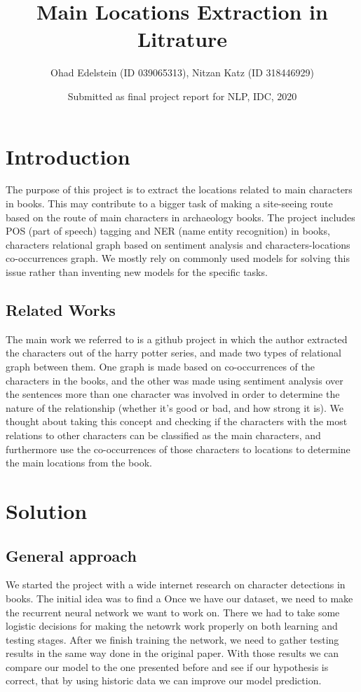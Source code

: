 \documentclass{article}
\title{Main Locations Extraction in Litrature}
\author{Ohad Edelstein (ID 039065313), Nitzan Katz (ID 318446929)}
\date{Submitted as final project report for NLP, IDC, 2020}
\begin{document}
\maketitle

\section{Introduction}

The purpose of this project is to extract the locations related to main characters in books. This may contribute to a bigger task of making a site-seeing route based on the route of main characters in archaeology books. The project includes POS (part of speech) tagging and NER (name entity recognition) in books, characters relational graph based on sentiment analysis and characters-locations co-occurrences graph. We mostly rely on commonly used models for solving this issue rather than inventing new models for the specific tasks.

\subsection{Related Works}
The main work we referred to is a github project\cite{hzjken2019char} in which the author extracted the characters out of the harry potter series, and made two types of relational graph between them. One graph is made based on co-occurrences of the characters in the books, and the other was made using sentiment analysis over the sentences more than one character was involved in order to determine the nature of the relationship (whether it's good or bad, and how strong it is). We thought about taking this concept and checking if the characters with the most relations to other characters can be classified as the main characters, and furthermore use the co-occurrences of those characters to locations to determine the main locations from the book.

\section{Solution}
\subsection{General approach}
We started the project with a wide internet research on character detections in books. The initial idea was to find a \newline
Once we have our dataset, we need to make the recurrent neural network we want to work on. There we had to take some logistic decisions for making the netowrk work properly on both learning and testing stages.\newline
After we finish training the network, we need to gather testing results in the same way done in the original paper. With those results we can compare our model to the one presented before and see if our hypothesis is correct, that by using historic data we can improve our model prediction.
\end{document}
